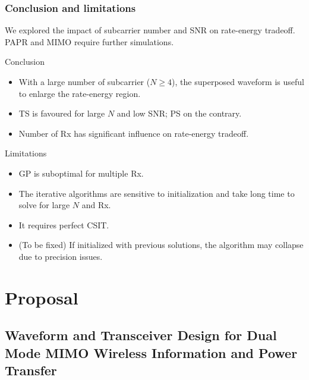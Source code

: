 \documentclass{beamer}
\begin{document}
\begin{frame}
\frametitle{Conclusion and limitations}

We explored the impact of subcarrier number and SNR on rate-energy tradeoff. PAPR and MIMO require further simulations.

\begin{block}{Conclusion}
\begin{itemize}
  \item With a large number of subcarrier ($N \geqslant 4$), the superposed waveform is useful to enlarge the rate-energy region.
  \item TS is favoured for large $N$ and low SNR; PS on the contrary.
  \item Number of Rx has significant influence on rate-energy tradeoff.
\end{itemize}
\end{block}

\begin{block}{Limitations}
\begin{itemize}
  \item GP is suboptimal for multiple Rx.
  \item The iterative algorithms are sensitive to initialization and take long time to solve for large $N$ and Rx.
  \item It requires perfect CSIT.
  \item (To be fixed) If initialized with previous solutions, the algorithm may collapse due to precision issues.
\end{itemize}
\end{block}

\end{frame}



\section{Proposal}
\subsection{Waveform and Transceiver Design for Dual Mode MIMO Wireless Information and Power Transfer}
\end{document}
